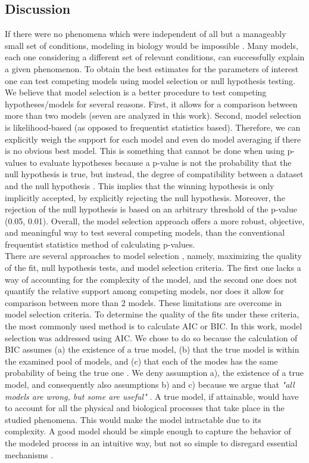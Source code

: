 \documentclass[titlepage,11pt]{article}
\begin{document}
\begin{linenumbers}
			\section{Discussion}
			If there were no phenomena which were independent of all but a manageably small set of conditions, modeling in biology would be impossible \cite{Wigner1995}. Many models, each one considering a different set of relevant conditions, can successfully explain a given phenomenon.  To obtain the best estimates for the parameters of interest one can test competing models using model selection or null hypothesis testing. We believe that model selection is a better procedure to test competing hypotheses/models for several reasons. First, it allows for a comparison between more than two models (seven are analyzed in this work). Second, model selection is likelihood-based (as opposed to frequentist statistics based). Therefore, we can explicitly weigh the support for each model and even do model averaging if there is no obvious best model. This is something that cannot be done when using p-values to evaluate hypotheses because a p-value is not the probability that the null hypothesis is true, but instead, the degree of compatibility between a dataset and the null hypothesis \cite{RonaldL.Wasserstein, Kim2016}. This implies that the winning hypothesis is only implicitly accepted, by explicitly rejecting the null hypothesis. Moreover, the rejection of the null hypothesis is based on an arbitrary threshold of the p-value (0.05, 0.01). Overall, the model selection approach offers a more robust, objective, and meaningful way to test several competing models, than the conventional frequentist statistics method of calculating p-values. \\
			There are several approaches to model selection \cite{Johnson2004}, namely,  maximizing the quality of the fit, null hypothesis tests, and model selection criteria. The first one lacks a way of accounting for the complexity of the model, and the second one does not quantify the relative support among competing models, nor does it allow for comparison between more than 2 models. These limitations are overcome in model selection criteria. To determine the quality of the fits under these criteria, the most commonly used method is to calculate AIC or BIC. In this work, model selection was addressed using AIC. We chose to do so because the calculation of BIC assumes (a) the existence of a true model, (b) that the true model is within the examined pool of models, and (c) that each of the modes has the same probability of being the true one \cite{Johnson2004}. We deny assumption a), the existence of a true model, and consequently also assumptions b) and c) because we argue that  \textit{"all models are wrong, but some are useful"} \cite{Box1976, Box1979}. A true model, if attainable, would have to account for all the physical and biological processes that take place in the studied phenomena. This would make the model intractable due to its complexity. A good model should be simple enough to capture the behavior of the modeled process in an intuitive way, but not so simple to disregard essential mechanisms \cite{Chatfield1995}. \\

\end{linenumbers}
\end{document}
